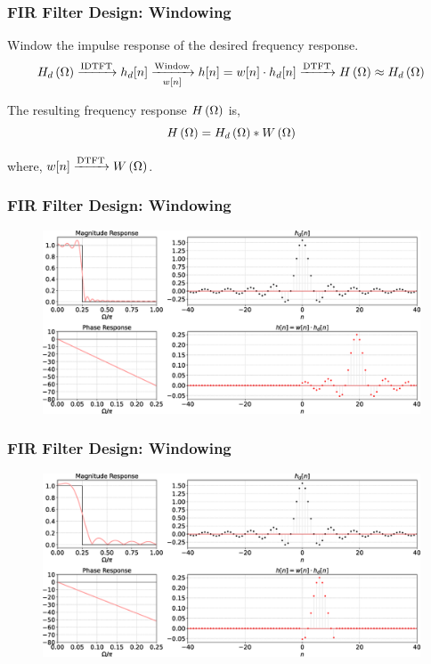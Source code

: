 \documentclass[aspectratio=169]{beamer}
\def\lp{\ensuremath\left(}
\def\rp{\ensuremath\right)}
\begin{document}
\begin{frame}[t]
  \frametitle{FIR Filter Design: Windowing}
  Window the impulse response of the desired frequency response.
  \[ H_d\lp \Omega \rp \xrightarrow[]{\text{IDTFT}} h_d[n] \xrightarrow[{w[n]}]{\text{Window}} h[n] = w[n] \cdot h_d[n] \xrightarrow[]{\text{DTFT}} H\lp \Omega \rp \approx H_d\lp \Omega \rp \]

  The resulting frequency response $H\lp \Omega \rp$ is,
  \[ H\lp \Omega \rp = H_d\lp \Omega \rp * W\lp \Omega \rp \]

  where, $w[n] \xrightarrow[]{\text{DTFT}} W \lp \Omega \rp$.
\end{frame}


\begin{frame}[t]
  \frametitle{FIR Filter Design: Windowing}
  
  \begin{figure}
  \centering
  \includegraphics[width=1\textwidth]{img/firwindow.eps}
  \end{figure}

\end{frame}


\begin{frame}[t]
  \frametitle{FIR Filter Design: Windowing}
  
  \begin{figure}
  \centering
  \includegraphics[width=1\textwidth]{img/firwindow2.eps}
  \end{figure}

\end{frame}
\end{document}
